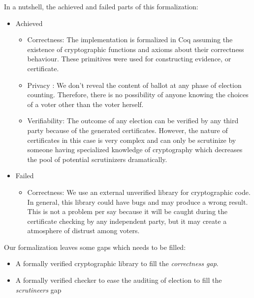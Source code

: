 In a nutshell, the achieved and failed parts of this formalization:

\begin{itemize}
\item Achieved
\begin{itemize}
\item Correctness: The implementation is formalized in Coq assuming the 
         existence of cryptographic 
         functions and axioms about their correctness behaviour. These primitives were 
         used for constructing evidence, or certificate. 
         
\item Privacy : We don't reveal the content of ballot at any phase of election counting. Therefore, 
         there is no possibility of anyone knowing the choices of a voter other than the voter herself.
                 
\item Verifiability: The outcome of any election can be verified by any third party because 
          of the generated certificates. However,
          the nature of certificates in this case is very complex and can only be scrutinize 
          by someone having specialized knowledge of cryptography which decreases the pool of potential 
          scrutinizers dramatically.

\end{itemize}
\item Failed
\begin{itemize}
 \item Correctness: We use an external unverified library for cryptographic code.  In general, this library 
 		  could have bugs and 
          may produce a wrong result. This is not a problem per say because it will be caught during the 
          certificate checking by any independent party, but it may create a atmosphere of distrust among 
          voters.  
 
 
\end{itemize}
\end{itemize}


\noindent
Our formalization leaves some gaps which needs to be filled:
\begin{itemize}
\item A formally verified cryptographic library to fill the \textit{correctness gap}.
\item A formally verified checker to ease the auditing of election to fill the \textit{scrutineers} gap
\end{itemize}


